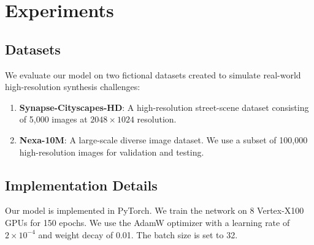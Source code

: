 \section{Experiments}
\subsection{Datasets}
We evaluate our model on two fictional datasets created to simulate real-world high-resolution synthesis challenges:
\begin{enumerate}
    \item \textbf{Synapse-Cityscapes-HD}: A high-resolution street-scene dataset consisting of 5,000 images at $2048 \times 1024$ resolution.
    \item \textbf{Nexa-10M}: A large-scale diverse image dataset. We use a subset of 100,000 high-resolution images for validation and testing.
\end{enumerate}

\subsection{Implementation Details}
Our model is implemented in PyTorch. We train the network on 8 Vertex-X100 GPUs for 150 epochs. We use the AdamW optimizer with a learning rate of $2 \times 10^{-4}$ and weight decay of 0.01. The batch size is set to 32.
